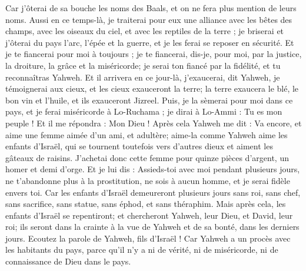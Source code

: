 \begin{multicols}{2}
Car j'ôterai de sa bouche les noms des Baals, et on ne fera plus mention de leurs noms.
Aussi en ce temps-là, je traiterai pour eux une alliance avec les bêtes des champs, avec les oiseaux du ciel, et avec les reptiles de la terre ; je briserai et j'ôterai du pays l'arc, l'épée et la guerre, et je les ferai se reposer en sécurité.
Et je te fiancerai pour moi à toujours ; je te fiancerai, dis-je, pour moi, par la justice, la droiture, la grâce et la miséricorde;
je serai ton fiancé par la fidélité, et tu reconnaîtras Yahweh.
Et il arrivera en ce jour-là, j'exaucerai, dit Yahweh, je témoignerai aux cieux, et les cieux exauceront la terre;
la terre exaucera le blé, le bon vin et l'huile, et ils exauceront Jizreel. 
Puis, je la sèmerai pour moi dans ce pays, et je ferai miséricorde à Lo-Ruchama ; je dirai à Lo-Ammi : Tu es mon peuple ! Et il me répondra : Mon Dieu !
\VerseOne{}Après cela Yahweh me dit : Va encore, et aime une femme aimée d'un ami, et adultère; aime-la comme Yahweh aime les enfants d'Israël, qui se tournent toutefois vers d'autres dieux et aiment les gâteaux de raisins.
J'achetai donc cette femme pour quinze pièces d'argent, un homer et demi d'orge.
Et je lui dis : Assieds-toi avec moi pendant plusieurs jours, ne t'abandonne plus à la prostitution, ne sois à aucun homme, et je serai fidèle envers toi.
Car les enfants d'Israël demeureront plusieurs jours sans roi, sans chef, sans sacrifice, sans statue, sans éphod, et sans théraphim.
Mais après cela, les enfants d'Israël se repentiront; et chercheront Yahweh, leur Dieu, et David, leur roi; ils seront dans la crainte à la vue de Yahweh et de sa bonté, dans les derniers jours.
\VerseOne{}Ecoutez la parole de Yahweh, fils d'Israël ! Car Yahweh a un procès avec les habitants du pays, parce qu'il n'y a ni de vérité, ni de miséricorde, ni de connaissance de Dieu dans le pays.

\end{multicols}
